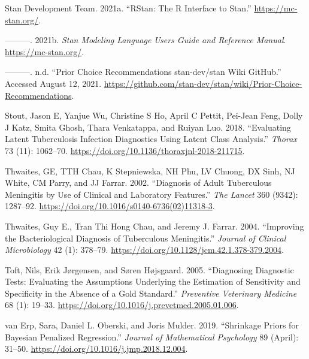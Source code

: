 \documentclass[
]{article}
\newlength{\cslhangindent}
\newlength{\cslentryspacingunit} %
\newenvironment{CSLReferences}[2] %
 {%
  \setlength{\parindent}{0pt}
  \ifodd #1
  \let\oldpar\par
  \def\par{\hangindent=\cslhangindent\oldpar}
  \fi
  \setlength{\parskip}{#2\cslentryspacingunit}
 }%
 {}
\begin{document}
\begin{CSLReferences}{1}{0}
\leavevmode{}%
Stan Development Team. 2021a. {``{RStan}: The {R} Interface to {Stan}.''} \url{https://mc-stan.org/}.

\leavevmode{}%
---------. 2021b. \emph{Stan Modeling Language Users Guide and Reference Manual}. \url{https://mc-stan.org/}.

\leavevmode{}%
---------. n.d. {``{Prior Choice Recommendations {\textperiodcentered} stan-dev/stan Wiki {\textperiodcentered} GitHub}.''} Accessed August 12, 2021. \url{https://github.com/stan-dev/stan/wiki/Prior-Choice-Recommendations}.

\leavevmode{}%
Stout, Jason E, Yanjue Wu, Christine S Ho, April C Pettit, Pei-Jean Feng, Dolly J Katz, Smita Ghosh, Thara Venkatappa, and Ruiyan Luo. 2018. {``Evaluating Latent Tuberculosis Infection Diagnostics Using Latent Class Analysis.''} \emph{Thorax} 73 (11): 1062--70. \url{https://doi.org/10.1136/thoraxjnl-2018-211715}.

\leavevmode{}%
Thwaites, GE, TTH Chau, K Stepniewska, NH Phu, LV Chuong, DX Sinh, NJ White, CM Parry, and JJ Farrar. 2002. {``Diagnosis of Adult Tuberculous Meningitis by Use of Clinical and Laboratory Features.''} \emph{The Lancet} 360 (9342): 1287--92. \url{https://doi.org/10.1016/s0140-6736(02)11318-3}.

\leavevmode{}%
Thwaites, Guy E., Tran Thi Hong Chau, and Jeremy J. Farrar. 2004. {``Improving the Bacteriological Diagnosis of Tuberculous Meningitis.''} \emph{Journal of Clinical Microbiology} 42 (1): 378--79. \url{https://doi.org/10.1128/jcm.42.1.378-379.2004}.

\leavevmode{}%
Toft, Nils, Erik Jørgensen, and Søren Højsgaard. 2005. {``Diagnosing Diagnostic Tests: Evaluating the Assumptions Underlying the Estimation of Sensitivity and Specificity in the Absence of a Gold Standard.''} \emph{Preventive Veterinary Medicine} 68 (1): 19--33. \url{https://doi.org/10.1016/j.prevetmed.2005.01.006}.

\leavevmode{}%
van Erp, Sara, Daniel L. Oberski, and Joris Mulder. 2019. {``Shrinkage Priors for Bayesian Penalized Regression.''} \emph{Journal of Mathematical Psychology} 89 (April): 31--50. \url{https://doi.org/10.1016/j.jmp.2018.12.004}.


\end{CSLReferences}
\end{document}
